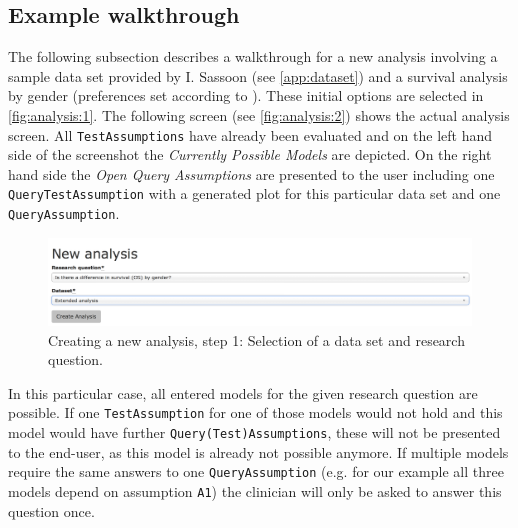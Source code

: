 \subsection{Example walkthrough}
\label{sub:walk}

The following subsection describes a walkthrough for a new analysis involving a sample data set provided by I. Sassoon (see \autoref{app:dataset}) and a survival analysis by gender (preferences set according to \cite{sassoon2016CD}). These initial options are selected in \autoref{fig:analysis:1}. The following screen (see \autoref{fig:analysis:2}) shows the actual analysis screen. All \texttt{TestAssumptions} have already been evaluated and on the left hand side of the screenshot the \textit{Currently Possible Models} are depicted. On the right hand side the \textit{Open Query Assumptions} are presented to the user including one \texttt{QueryTestAssumption} with a generated plot for this particular data set and one \texttt{QueryAssumption}. 

\begin{figure}[h]
	\centering
	\includegraphics[width=\textwidth]{figures/ui_analysis_0}
	\caption{Creating a new analysis, step 1: Selection of a data set and research question. }
	\label{fig:analysis:1}
\end{figure}

In this particular case, all entered models for the given research question are possible. If one \texttt{TestAssumption} for one of those models would not hold and this model would have further \texttt{Query(Test)Assumptions}, these will not be presented to the end-user, as this model is already not possible anymore. If multiple models require the same answers to one \texttt{QueryAssumption} (e.g. for our example all three models depend on assumption \texttt{A1}) the clinician will only be asked to answer this question once. 

